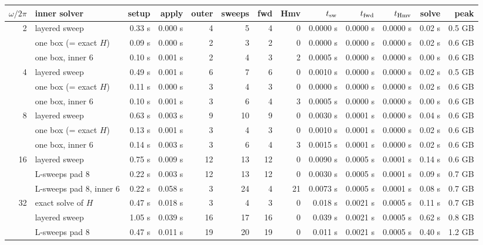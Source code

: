 \documentclass[11pt]{article}
\begin{document}
\begin{center}\scriptsize\setlength{\tabcolsep}{2.2pt}
\begin{tabular}{rlrrrrrrrrrrr}
\toprule
$\omega/2\pi$ & inner solver & setup & apply & outer & sweeps & fwd & Hmv & $t_{\rm sw}$ & $t_{\rm fwd}$ & $t_{\rm Hmv}$ & solve & peak \\
\midrule
2 & layered sweep & 0.33 s & 0.000 s & 4 & 5 & 4 & 0 & 0.0000 s & 0.0000 s & 0.0000 s & 0.02 s & 0.5 GB \\
 & one box (= exact $H$) & 0.09 s & 0.000 s & 2 & 3 & 2 & 0 & 0.0000 s & 0.0000 s & 0.0000 s & 0.02 s & 0.6 GB \\
 & one box, inner 6 & 0.10 s & 0.001 s & 2 & 4 & 3 & 2 & 0.0005 s & 0.0000 s & 0.0000 s & 0.00 s & 0.6 GB \\
4 & layered sweep & 0.49 s & 0.001 s & 6 & 7 & 6 & 0 & 0.0010 s & 0.0000 s & 0.0000 s & 0.02 s & 0.5 GB \\
 & one box (= exact $H$) & 0.11 s & 0.000 s & 3 & 4 & 3 & 0 & 0.0000 s & 0.0000 s & 0.0000 s & 0.02 s & 0.6 GB \\
 & one box, inner 6 & 0.10 s & 0.001 s & 3 & 6 & 4 & 3 & 0.0005 s & 0.0000 s & 0.0000 s & 0.00 s & 0.6 GB \\
8 & layered sweep & 0.63 s & 0.003 s & 9 & 10 & 9 & 0 & 0.0030 s & 0.0001 s & 0.0000 s & 0.04 s & 0.6 GB \\
 & one box (= exact $H$) & 0.13 s & 0.001 s & 3 & 4 & 3 & 0 & 0.0010 s & 0.0001 s & 0.0000 s & 0.02 s & 0.6 GB \\
 & one box, inner 6 & 0.14 s & 0.003 s & 3 & 6 & 4 & 3 & 0.0015 s & 0.0001 s & 0.0000 s & 0.02 s & 0.6 GB \\
16 & layered sweep & 0.75 s & 0.009 s & 12 & 13 & 12 & 0 & 0.0090 s & 0.0005 s & 0.0001 s & 0.14 s & 0.6 GB \\
 & L-sweeps pad 8 & 0.22 s & 0.003 s & 12 & 13 & 12 & 0 & 0.0030 s & 0.0005 s & 0.0001 s & 0.09 s & 0.7 GB \\
 & L-sweeps pad 8, inner 6 & 0.22 s & 0.058 s & 3 & 24 & 4 & 21 & 0.0073 s & 0.0005 s & 0.0001 s & 0.08 s & 0.7 GB \\
32 & exact solve of $H$ & 0.47 s & 0.018 s & 3 & 4 & 3 & 0 & 0.018 s & 0.0021 s & 0.0005 s & 0.11 s & 0.7 GB \\
 & layered sweep & 1.05 s & 0.039 s & 16 & 17 & 16 & 0 & 0.039 s & 0.0021 s & 0.0005 s & 0.62 s & 0.8 GB \\
 & L-sweeps pad 8 & 0.47 s & 0.011 s & 19 & 20 & 19 & 0 & 0.011 s & 0.0021 s & 0.0005 s & 0.40 s & 1.2 GB \\

\end{tabular}
\end{center}
\end{document}

